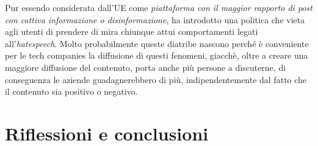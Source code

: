 \documentclass{article}
\begin{document}
\begin{justify}
    Pur essendo considerata dall'UE come \textit{piattaforma con il maggior rapporto di post con cattiva informazione o disinformazione}, ha introdotto una politica che vieta agli utenti di prendere di mira chiunque attui comportamenti legati all'\textit{hatespeech}.
    Molto probabilmente queste diatribe nascono perché è conveniente per le tech companies la diffusione di questi fenomeni, giacchè, oltre a creare una maggiore diffusione del contenuto, porta anche più persone a discuterne, di conseguenza le aziende guadagnerebbero di più, indipendentemente dal fatto che il contenuto sia positivo o negativo.
\end{justify}

\centering
\newpage\section{Riflessioni e conclusioni}
\end{document}
